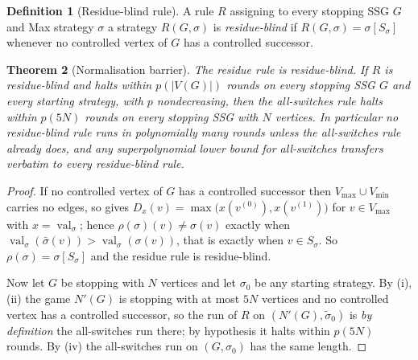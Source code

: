 \documentclass[11pt]{article}
\theoremstyle{plain}
\newtheorem{theorem}{Theorem}[section]
\theoremstyle{definition}
\newtheorem{definition}[theorem]{Definition}
\DeclareMathOperator{\val}{val}
\newcommand{\Vmax}{V_{\max}}
\newcommand{\Vmin}{V_{\min}}
\begin{document}
\begin{definition}[Residue-blind rule]\label{def:residue-blind}
A rule $R$ assigning to every stopping SSG $G$ and Max strategy $\sigma$
a strategy $R(G,\sigma)$ is \emph{residue-blind} if
$R(G,\sigma)=\sigma[S_\sigma]$ whenever no controlled vertex of $G$ has a
controlled successor.
\end{definition}

\begin{theorem}[Normalisation barrier]\label{thm:normalform-barrier}
The residue rule is residue-blind. If $R$ is residue-blind and halts
within $p(|V(G)|)$ rounds on every stopping SSG $G$ and every starting
strategy, with $p$ nondecreasing, then the all-switches rule halts within
$p(5N)$ rounds on every
stopping SSG with $N$ vertices. In particular no residue-blind rule runs
in polynomially many rounds unless the all-switches rule already does,
and any superpolynomial lower bound for all-switches transfers verbatim
to every residue-blind rule.
\end{theorem}

\begin{proof}
If no controlled vertex of $G$ has a controlled successor then
$\Vmax\cup\Vmin$ carries no edges, so  gives
$D_x(v)=\max\bigl(x(v^{(0)}),x(v^{(1)})\bigr)$ for $v\in\Vmax$ with
$x=\val_\sigma$; hence $\rho(\sigma)(v)\ne\sigma(v)$ exactly when
$\val_\sigma(\bar\sigma(v))>\val_\sigma(\sigma(v))$, that is exactly when
$v\in S_\sigma$. So $\rho(\sigma)=\sigma[S_\sigma]$ and the residue rule
is residue-blind.

Now let $G$ be stopping with $N$ vertices and let $\sigma_0$ be any
starting strategy. By (i),(ii) the game $N'(G)$ is
stopping with at most $5N$ vertices and no controlled vertex has a
controlled successor, so the run of $R$ on $(N'(G),\tilde\sigma_0)$ is
\emph{by definition} the all-switches run there; by hypothesis it halts
within $p(5N)$ rounds. By (iv) the all-switches run
on $(G,\sigma_0)$ has the same length.
\end{proof}
\end{document}
